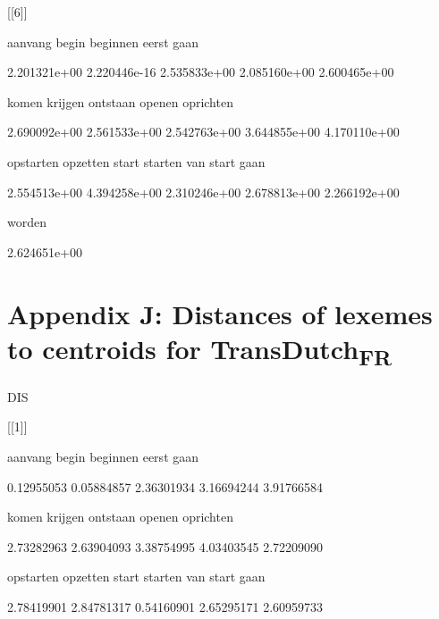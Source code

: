 [[6]]



       aanvang          begin       beginnen          eerst           gaan 



  2.201321e+00   2.220446e-16   2.535833e+00   2.085160e+00   2.600465e+00 



         komen        krijgen       ontstaan         openen      oprichten 



  2.690092e+00   2.561533e+00   2.542763e+00   3.644855e+00   4.170110e+00 



     opstarten       opzetten          start        starten van start gaan 



  2.554513e+00   4.394258e+00   2.310246e+00   2.678813e+00   2.266192e+00 



        worden 



  2.624651e+00 


\section{Appendix J: Distances of lexemes to centroids for TransDutch\textsubscript{FR}}

DIS



[[1]]



       aanvang          begin       beginnen          eerst           gaan 



    0.12955053     0.05884857     2.36301934     3.16694244     3.91766584 



         komen        krijgen       ontstaan         openen      oprichten 



    2.73282963     2.63904093     3.38754995     4.03403545     2.72209090 



     opstarten       opzetten          start        starten van start gaan 



    2.78419901     2.84781317     0.54160901     2.65295171     2.60959733 



